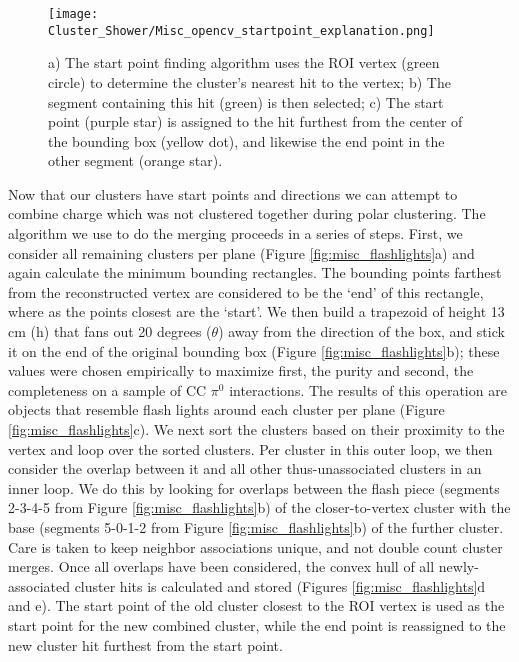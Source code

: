 \begin{figure}[h!]
\centering
\texttt{[image: Cluster\_Shower/Misc\_opencv\_startpoint\_explanation.png]}
\caption{ a) The start point finding algorithm uses the ROI vertex (green circle) to determine the
cluster’s nearest hit to the vertex; b) The segment containing this hit (green) is then selected; c) The
start point (purple star) is assigned to the hit furthest from the center of the bounding box (yellow
dot), and likewise the end point in the other segment (orange star). }
\label{fig:misc_opencv_startpoint}
\end{figure}

\par Now that our clusters have start points and directions we can attempt to combine charge which was not clustered together during polar clustering. The algorithm we use to do the merging proceeds in a series of steps.  First, we consider all remaining clusters per plane (Figure \ref{fig:misc_flashlights}a) and again calculate the minimum bounding rectangles. The bounding points farthest from the reconstructed vertex are considered to be the `end' of this rectangle, where as the points closest are the `start'.  We then build a trapezoid of height 13 cm (h) that fans out 20 degrees ($\theta$) away from the direction of the box, and stick it on the end of the original bounding box (Figure \ref{fig:misc_flashlights}b); these values were chosen empirically to maximize first, the purity and second, the completeness on a sample of CC $\pi^0$ interactions.  The results of this operation are objects that resemble flash lights around each cluster per plane (Figure \ref{fig:misc_flashlights}c). We next sort the clusters based on their proximity to the vertex and loop over the sorted clusters. Per cluster in this outer loop, we then consider the overlap between it and all other thus-unassociated clusters in an inner loop.  We do this by looking for overlaps between the flash piece (segments 2-3-4-5 from Figure \ref{fig:misc_flashlights}b) of the closer-to-vertex cluster with the base (segments 5-0-1-2 from Figure \ref{fig:misc_flashlights}b) of the further cluster. Care is taken to keep neighbor associations unique, and not double count cluster merges. Once all overlaps have been considered, the convex hull \cite{bib:convexHull} of all newly-associated cluster hits is calculated and stored (Figures \ref{fig:misc_flashlights}d and e). The start point of the old cluster closest to the ROI vertex is used as the start point for the new combined cluster, while the end point is reassigned to the new cluster hit furthest from the start point.

